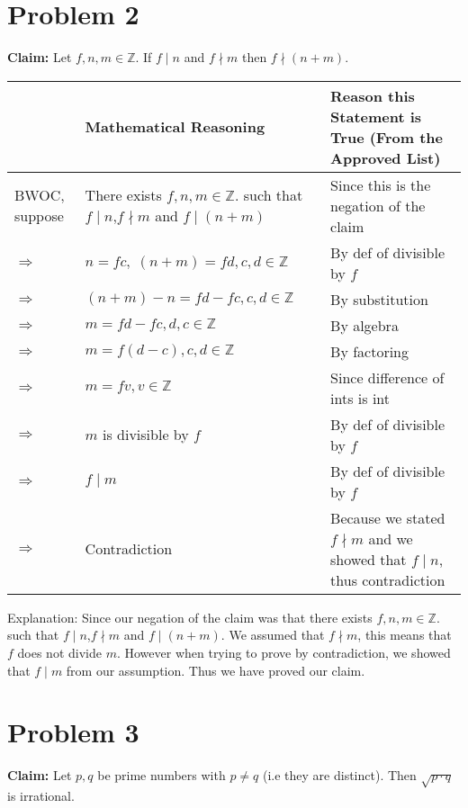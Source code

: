 \documentclass{article}
\begin{document}
\pagebreak

\section{Problem 2}
\textbf{Claim:} Let $f,n,m\in\mathbb{Z}$. If $f\mid n$ and $f\nmid m$ then $f\nmid (n+m)$.

\begin{flushleft}
    \begin{tabular}{|p{1.3cm}|p{5.4cm}|p{5.9cm}|}
    \hline
     & \textbf{Mathematical Reasoning} & \textbf{Reason this Statement is True (From the Approved List)} \\
    \hline
    BWOC, suppose & There exists $f,n,m\in\mathbb{Z}$. such that $f\mid n$,$f\nmid m$ and $f\mid(n+m)$ & Since this is the negation of the claim\\
    \hline
    $\Rightarrow$ & $n=fc,\;(n+m)=fd,c,d\in\mathbb{Z}$ & By def of divisible by $f$\\
    \hline
    $\Rightarrow$ & $(n+m)-n=fd-fc,c,d\in\mathbb{Z}$ & By substitution\\
    \hline
    $\Rightarrow$ & $m=fd-fc,d,c\in\mathbb{Z}$ & By algebra \\
    \hline
    $\Rightarrow$ & $m=f(d-c),c,d\in\mathbb{Z}$ & By factoring \\
    \hline 
    $\Rightarrow$ & $m=fv,v\in\mathbb{Z}$ & Since difference of ints is int \\
    \hline
    $\Rightarrow$ & $m$ is divisible by $f$ & By def of divisible by $f$ \\ 
    \hline
    $\Rightarrow$ & $f\mid m$ & By def of divisible by $f$ \\
    \hline
    $\Rightarrow$ & Contradiction & Because we stated $f\nmid m$ and we showed that $f\mid n$, thus contradiction\\
    \hline
    \end{tabular}
\end{flushleft}\vspace{5pt}

Explanation: Since our negation of the claim was that there exists $f,n,m\in\mathbb{Z}$. such that $f\mid n$,$f\nmid m$ and $f\mid(n+m)$.  We assumed that $f\nmid m$, this means that $f$ does not divide $m$.  However when trying to prove by contradiction, we showed that $f\mid m$ from our assumption.  Thus we have proved our claim.


\pagebreak
\section{Problem 3}
\textbf{Claim:} Let $p,q$ be prime numbers with $p\neq q$ (i.e they are distinct). Then $\sqrt{p\cdot q}$ is irrational.\vspace{10pt}
\end{document}

